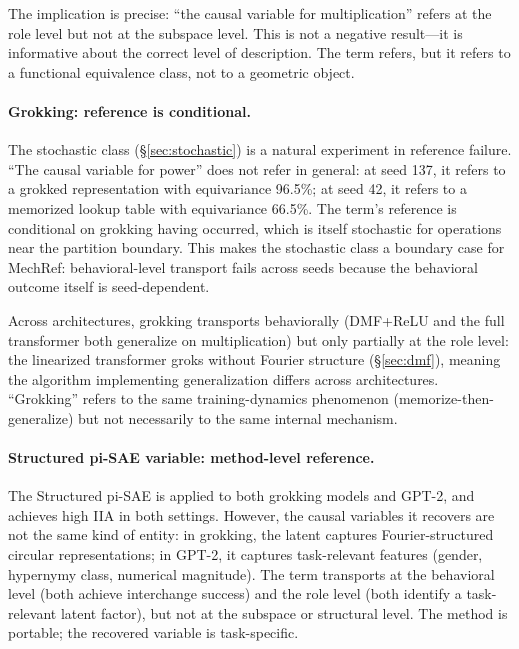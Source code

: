 The implication is precise: ``the causal variable for multiplication'' refers
at the role level but not at the subspace level. This is not a negative
result---it is informative about the correct level of description. The term
refers, but it refers to a functional equivalence class, not to a geometric
object.

\paragraph{Grokking: reference is conditional.}
The stochastic class (\S\ref{sec:stochastic}) is a natural experiment in
reference failure. ``The causal variable for power'' does not refer in
general: at seed 137, it refers to a grokked representation with
equivariance 96.5\%; at seed 42, it refers to a memorized lookup table with
equivariance 66.5\%. The term's reference is conditional on grokking having
occurred, which is itself stochastic for operations near the partition
boundary. This makes the stochastic class a boundary case for MechRef:
behavioral-level transport fails across seeds because the behavioral outcome
itself is seed-dependent.

Across architectures, grokking transports behaviorally (DMF+ReLU and the
full transformer both generalize on multiplication) but only partially at
the role level: the linearized transformer groks without Fourier structure
(\S\ref{sec:dmf}), meaning the algorithm implementing generalization differs
across architectures. ``Grokking'' refers to the same training-dynamics
phenomenon (memorize-then-generalize) but not necessarily to the same
internal mechanism.

\paragraph{Structured pi-SAE variable: method-level reference.}
The Structured pi-SAE is applied to both grokking models and GPT-2, and
achieves high IIA in both settings. However, the causal variables it
recovers are not the same kind of entity: in grokking, the latent captures
Fourier-structured circular representations; in GPT-2, it captures
task-relevant features (gender, hypernymy class, numerical magnitude). The
term transports at the behavioral level (both achieve interchange success)
and the role level (both identify a task-relevant latent factor), but not at
the subspace or structural level. The method is portable; the recovered
variable is task-specific.

